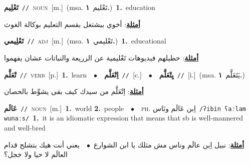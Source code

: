 \documentclass[10pt,a4paper,twoside]{article} %
\begin{document}
\begin{multicols}{2}
{\setlength\topsep{0pt}\textbf{\foreignlanguage{arabic}{تَعْلِيم}}\ {\color{gray}\texttt{//}\color{black}}\ \textsc{noun}\ [m.]\ \color{gray}(msa. \foreignlanguage{arabic}{تَعْليم}~\foreignlanguage{arabic}{\textbf{١.}})\color{black}\ \textbf{1.}~education\  \begin{flushright}\color{gray}\foreignlanguage{arabic}{\textbf{\underline{\foreignlanguage{arabic}{أمثلة}}}: أخوي بيشتغل بقسم التعليم بوكالة الغوث}\end{flushright}\color{black}} \vspace{2mm}

{\setlength\topsep{0pt}\textbf{\foreignlanguage{arabic}{تَعْلِيمي}}\ {\color{gray}\texttt{//}\color{black}}\ \textsc{adj}\ [m.]\ \color{gray}(msa. \foreignlanguage{arabic}{تَعْليمي}~\foreignlanguage{arabic}{\textbf{١.}})\color{black}\ \textbf{1.}~educational\  \begin{flushright}\color{gray}\foreignlanguage{arabic}{\textbf{\underline{\foreignlanguage{arabic}{أمثلة}}}: حطيلهم فيديوهات تَعْليمية عن الزريعة والنباتات عشان يفهموا}\end{flushright}\color{black}} \vspace{2mm}

{\setlength\topsep{0pt}\textbf{\foreignlanguage{arabic}{تْعَلَّم}}\ {\color{gray}\texttt{//}\color{black}}\ \textsc{verb}\ [p.]\ \textbf{1.}~learn\ \ $\bullet$\ \ \setlength\topsep{0pt}\textbf{\foreignlanguage{arabic}{اِتْعَلَّم}}\ {\color{gray}\texttt{//}\color{black}}\ [c.]\ \ $\bullet$\ \ \setlength\topsep{0pt}\textbf{\foreignlanguage{arabic}{يِتْعَلَّم}}\ {\color{gray}\texttt{//}\color{black}}\ [i.]\ \color{gray}(msa. \foreignlanguage{arabic}{يَتَعَلَّم}~\foreignlanguage{arabic}{\textbf{١.}})\color{black}\  \begin{flushright}\color{gray}\foreignlanguage{arabic}{\textbf{\underline{\foreignlanguage{arabic}{أمثلة}}}: اِتْعَلَّم من سيدك كيف بقى يشوِّط بالحصان}\end{flushright}\color{black}} \vspace{2mm}

{\setlength\topsep{0pt}\textbf{\foreignlanguage{arabic}{عَالَم}}\ {\color{gray}\texttt{//}\color{black}}\ \textsc{noun}\ [m.]\ \textbf{1.}~world  \textbf{2.}~people\ \ $\bullet$\ \ \textsc{ph.} \color{gray} \foreignlanguage{arabic}{اِبن عَالَم ونَاس}\color{black}\ {\color{gray}\texttt{/{\sffamily ʔibin ʕaːlam wunaːs}/}\color{black}}\ \textbf{1.}~it is an idiomatic expression that means that sb is well-mannered and well-bred\  \begin{flushright}\color{gray}\foreignlanguage{arabic}{\textbf{\underline{\foreignlanguage{arabic}{أمثلة}}}: نبيل اِبن عالَم وناس مش مثلك يا ابن الشوارع\ $\bullet$\ \  يعني أنت هيك بتشلح قدام العالَم لا حيا ولا خجل؟}\end{flushright}\color{black}} \vspace{2mm}


\end{multicols}
\end{document}
